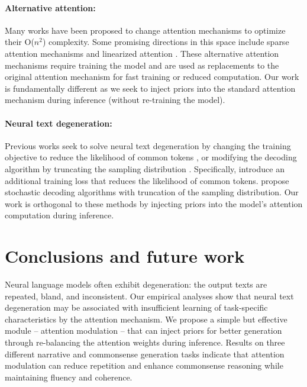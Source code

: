 \documentclass[11pt,a4paper]{article}
\newcommand{\alg}{attention modulation}
\begin{document}
\paragraph{Alternative attention:}
Many works have been proposed to change attention mechanisms to optimize their O($n^2$) complexity. Some promising directions in this space include sparse attention mechanisms \citep{beltagy2020longformer,zaheer2020big} and linearized attention \citep{choromanski2020rethinking}. These alternative attention mechanisms require training the model and are used as replacements to the original attention mechanism for fast training or reduced computation.  
Our work is fundamentally different as we seek to inject priors into the standard attention mechanism during inference (without re-training the model). 

\paragraph{Neural text degeneration:}
Previous works seek to solve neural text degeneration by changing the training objective to reduce the likelihood of common tokens \citep{welleck2020neural}, or modifying the decoding algorithm by truncating the sampling distribution \citep{holtzman-etal-2018-learning,holtzman2020curious}.  
Specifically, \citet{welleck2020neural} introduce an additional training loss that reduces the likelihood of common tokens. 
\citet{holtzman-etal-2018-learning,holtzman2020curious} propose stochastic decoding algorithms with truncation of the sampling distribution. 
Our work is orthogonal to these methods by injecting priors into the model's attention computation during inference. 




\section{Conclusions and future work}
Neural language models often exhibit degeneration: the output texts are repeated, bland, and inconsistent. Our empirical analyses show that neural text degeneration may be associated with insufficient learning of task-specific characteristics by the attention mechanism. We propose a simple but effective module -- \alg{} -- that can inject priors for better generation through re-balancing the attention weights during inference. Results on three different narrative and commonsense generation tasks indicate that \alg{} can reduce repetition and enhance commonsense reasoning while maintaining fluency and coherence. 
\end{document}
